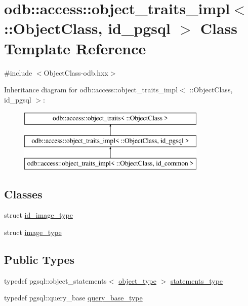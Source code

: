 \hypertarget{classodb_1_1access_1_1object__traits__impl_3_01_1_1_object_class_00_01id__pgsql_01_4}{}\section{odb\+:\+:access\+:\+:object\+\_\+traits\+\_\+impl$<$ \+:\+:Object\+Class, id\+\_\+pgsql $>$ Class Template Reference}
\label{classodb_1_1access_1_1object__traits__impl_3_01_1_1_object_class_00_01id__pgsql_01_4}


{\ttfamily \#include $<$Object\+Class-\/odb.\+hxx$>$}

Inheritance diagram for odb\+:\+:access\+:\+:object\+\_\+traits\+\_\+impl$<$ \+:\+:Object\+Class, id\+\_\+pgsql $>$\+:\begin{figure}[H]
\begin{center}
\leavevmode
\includegraphics[height=3.000000cm]{d1/db7/classodb_1_1access_1_1object__traits__impl_3_01_1_1_object_class_00_01id__pgsql_01_4}
\end{center}
\end{figure}
\subsection*{Classes}
\begin{DoxyCompactItemize}
\item 
struct \hyperlink{structodb_1_1access_1_1object__traits__impl_3_01_1_1_object_class_00_01id__pgsql_01_4_1_1id__image__type}{id\+\_\+image\+\_\+type}
\item 
struct \hyperlink{structodb_1_1access_1_1object__traits__impl_3_01_1_1_object_class_00_01id__pgsql_01_4_1_1image__type}{image\+\_\+type}
\end{DoxyCompactItemize}
\subsection*{Public Types}
\begin{DoxyCompactItemize}
\item 
typedef pgsql\+::object\+\_\+statements$<$ \hyperlink{classodb_1_1access_1_1object__traits_3_01_1_1_object_class_01_4_ace038dbac6a8699ff387d2de36db3f85}{object\+\_\+type} $>$ \hyperlink{classodb_1_1access_1_1object__traits__impl_3_01_1_1_object_class_00_01id__pgsql_01_4_ab2af20fa34186f1508b78331eabb4307}{statements\+\_\+type}
\item 
typedef pgsql\+::query\+\_\+base \hyperlink{classodb_1_1access_1_1object__traits__impl_3_01_1_1_object_class_00_01id__pgsql_01_4_a7659546fe4a62dbf5953feb594bdb87d}{query\+\_\+base\+\_\+type}
\end{DoxyCompactItemize}
